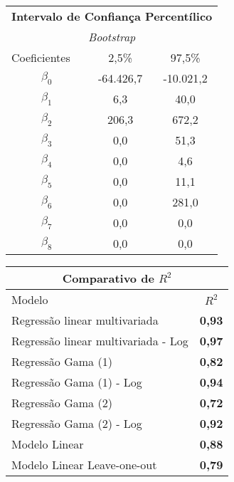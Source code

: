 \documentclass{article}
\begin{document}
\begin{table}[]
	\centering
	\begin{tabular}{ccc}
		\hline
		\multicolumn{3}{c}{\textbf{Intervalo de Confiança Percentílico}} \\ 
		\multicolumn{3}{c}{\textit{Bootstrap}}                           \\ \hline \hline
		\multicolumn{1}{l}{Coeficientes}    & 2,5\%        & 97,5\%      \\ \hline
		$\beta_0$                           & -64.426,7    & -10.021,2   \\
		$\beta_1$                           & 6,3          & 40,0        \\
		$\beta_2$                           & 206,3        & 672,2       \\
		$\beta_3$                           & 0,0          & 51,3        \\
		$\beta_4$                           & 0,0          & 4,6         \\
		$\beta_5$                           & 0,0          & 11,1        \\
		$\beta_6$                           & 0,0          & 281,0       \\
		$\beta_7$                           & 0,0          & 0,0         \\
		$\beta_8$                           & 0,0          & 0,0         \\ \hline
	\end{tabular}
\end{table}

\begin{table}[]
	\centering
	\begin{tabular}{lc}
		\hline
		\multicolumn{2}{c}{\textbf{Comparativo de $R^{2}$}} \\ \hline
		Modelo                         & \textbf{$R^{2}$}   \\ \hline
		Regressão linear multivariada  & \textbf{0,93}      \\
		Regressão linear multivariada - Log            & \textbf{0,97}      \\
		Regressão Gama (1)                & \textbf{0,82}          \\
		Regressão Gama (1) - Log          & \textbf{0,94}          \\
		Regressão Gama (2)         	   & \textbf{0,72}      \\
		Regressão Gama (2) - Log   	   & \textbf{0,92}      \\
		Modelo Linear                  & \textbf{0,88}      \\
		Modelo Linear Leave-one-out    & \textbf{0,79}      \\ \hline
	\end{tabular}
\end{table}
\end{document}
